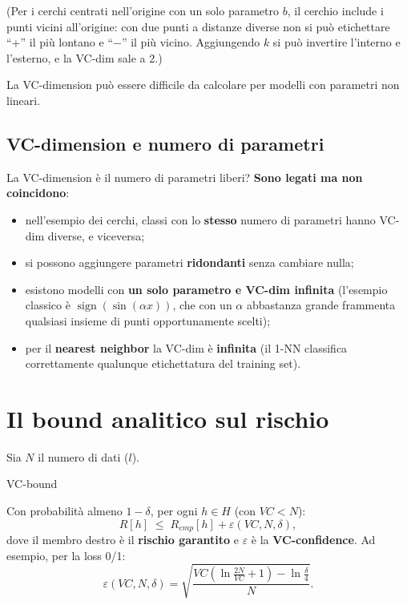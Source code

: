 (Per i cerchi centrati nell'origine con un solo parametro \(b\), il
cerchio include i punti vicini all'origine: con due punti a distanze
diverse non si può etichettare ``+'' il più lontano e ``−'' il più
vicino. Aggiungendo \(k\) si può invertire l'interno e l'esterno, e la
VC-dim sale a 2.)

La VC-dimension può essere difficile da calcolare per modelli con
parametri non lineari.

\subsection{VC-dimension e numero di
parametri}\label{vc-dimension-e-numero-di-parametri}

La VC-dimension è il numero di parametri liberi? \textbf{Sono legati ma
non coincidono}:

\begin{itemize}
\tightlist
\item
  nell'esempio dei cerchi, classi con lo \textbf{stesso} numero di
  parametri hanno VC-dim diverse, e viceversa;
\item
  si possono aggiungere parametri \textbf{ridondanti} senza cambiare
  nulla;
\item
  esistono modelli con \textbf{un solo parametro e VC-dim infinita}
  (l'esempio classico è \(\operatorname{sign}(\sin(\alpha x))\), che con
  un \(\alpha\) abbastanza grande frammenta qualsiasi insieme di punti
  opportunamente scelti);
\item
  per il \textbf{nearest neighbor} la VC-dim è \textbf{infinita} (il
  1-NN classifica correttamente qualunque etichettatura del training
  set).
\end{itemize}

\section{Il bound analitico sul
rischio}\label{il-bound-analitico-sul-rischio}

Sia \(N\) il numero di dati (\(l\)).

\begin{boxtheorem}{VC-bound}

Con probabilità almeno \(1 - \delta\), per ogni \(h \in H\) (con
\(VC < N\)): \[
R[h] \;\le\; R_{emp}[h] + \varepsilon(VC, N, \delta),
\] dove il membro destro è il \textbf{rischio garantito} e
\(\varepsilon\) è la \textbf{VC-confidence}. Ad esempio, per la loss
0/1: \[
\varepsilon(VC, N, \delta) = \sqrt{\frac{VC\left(\ln\frac{2N}{VC} + 1\right) - \ln\frac{\delta}{4}}{N}}.
\]

\end{boxtheorem}

